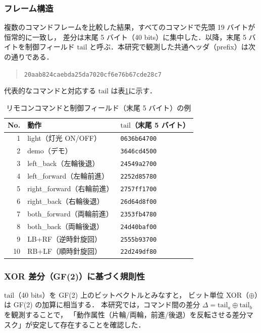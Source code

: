 \documentclass[twocolumn,10pt,a4paper]{jsarticle}
\begin{document}
\subsubsection{フレーム構造}
複数のコマンドフレームを比較した結果，すべてのコマンドで先頭 19 バイトが恒常的に一致し，
差分は末尾 5 バイト（40 bits）に集中した．以降，末尾 5 バイトを制御フィールド
$\mathrm{tail}$ と呼ぶ．本研究で観測した共通ヘッダ（prefix）は次の通りである．

\begin{quote}
\texttt{20aab824caebda25da7020cf6e76b67cde28c7}
\end{quote}
%
\noindent\hspace{1zw}代表的なコマンドと対応する $\mathrm{tail}$ は表\ref{tab:cmd_tail}に示す．

\begin{table}[t]
\centering
\caption{リモコンコマンドと制御フィールド（末尾 5 バイト）の例}
\label{tab:cmd_tail}
\begin{tabular}{r l l}
\hline
No. & 動作 & $\mathrm{tail}$（末尾 5 バイト）\\
\hline
1  & light（灯光 ON/OFF）        & \texttt{0636b64700} \\
2  & demo（デモ）                & \texttt{3646cd4500} \\
3  & left\_back（左輪後退）       & \texttt{24549a2700} \\
4  & left\_forward（左輪前進）    & \texttt{2252d85780} \\
5  & right\_forward（右輪前進）   & \texttt{2757ff1700} \\
6  & right\_back（右輪後退）      & \texttt{26d64d8f00} \\
7  & both\_forward（両輪前進）    & \texttt{2353fb4780} \\
8  & both\_back（両輪後退）       & \texttt{24d40baf00} \\
9  & LB+RF（逆時針旋回）          & \texttt{2555b93700} \\
10 & RB+LF（順時針旋回）          & \texttt{22d249df80} \\
\hline
\end{tabular}
\end{table}

\subsubsection{XOR 差分（GF(2)）に基づく規則性}
$\mathrm{tail}$（40 bits）を GF(2) 上のビットベクトルとみなすと，
ビット単位 XOR（$\oplus$）は GF(2) の加算に相当する\cite{LinCostello2004}．
本研究では，コマンド間の差分 $\Delta = \mathrm{tail}_a \oplus \mathrm{tail}_b$ を観測することで，
「動作属性（片輪/両輪，前進/後退）を反転させる差分マスク」が安定して存在することを確認した．
\end{document}
